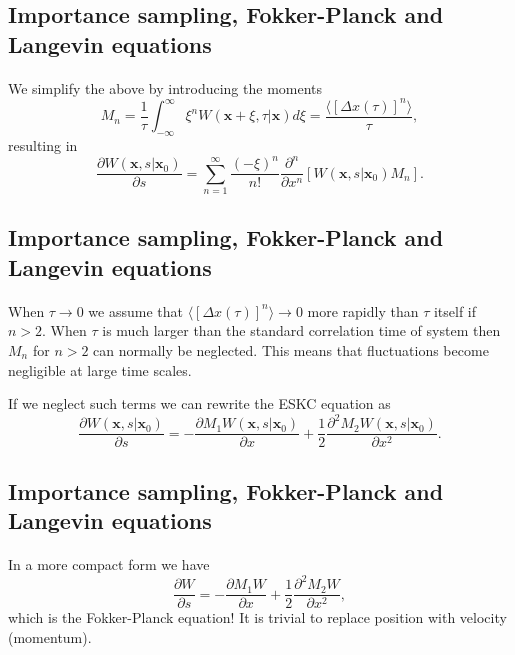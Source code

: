 \documentclass[%
twoside,                 %
final,                   %
10pt]{article}
\begin{document}
\subsection*{Importance sampling, Fokker-Planck and Langevin equations}

\paragraph{}
We simplify the above by introducing the moments 
\[
M_n=\frac{1}{\tau}\int_{-\infty}^{\infty} \xi^nW(\mathbf{x}+\xi,\tau|\mathbf{x})d\xi=
\frac{\langle [\Delta x(\tau)]^n\rangle}{\tau},
\]
resulting in
\[
\frac{\partial W(\mathbf{x},s|\mathbf{x}_0)}{\partial s}=
\sum_{n=1}^{\infty}\frac{(-\xi)^n}{n!}\frac{\partial^n}{\partial x^n}
\left[W(\mathbf{x},s|\mathbf{x}_0)M_n\right].
\]




\subsection*{Importance sampling, Fokker-Planck and Langevin equations}

\paragraph{}
When $\tau \rightarrow 0$ we assume that $\langle [\Delta x(\tau)]^n\rangle \rightarrow 0$ more rapidly than $\tau$ itself if $n > 2$. 
When $\tau$ is much larger than the standard correlation time of 
system then $M_n$ for $n > 2$ can normally be neglected.
This means that fluctuations become negligible at large time scales.

If we neglect such terms we can rewrite the ESKC equation as 
\[
\frac{\partial W(\mathbf{x},s|\mathbf{x}_0)}{\partial s}=
-\frac{\partial M_1W(\mathbf{x},s|\mathbf{x}_0)}{\partial x}+
\frac{1}{2}\frac{\partial^2 M_2W(\mathbf{x},s|\mathbf{x}_0)}{\partial x^2}.
\]




\subsection*{Importance sampling, Fokker-Planck and Langevin equations}

\paragraph{}
In a more compact form we have
\[
\frac{\partial W}{\partial s}=
-\frac{\partial M_1W}{\partial x}+
\frac{1}{2}\frac{\partial^2 M_2W}{\partial x^2},
\]
which is the Fokker-Planck equation!  It is trivial to replace 
position with velocity (momentum).
\end{document}
